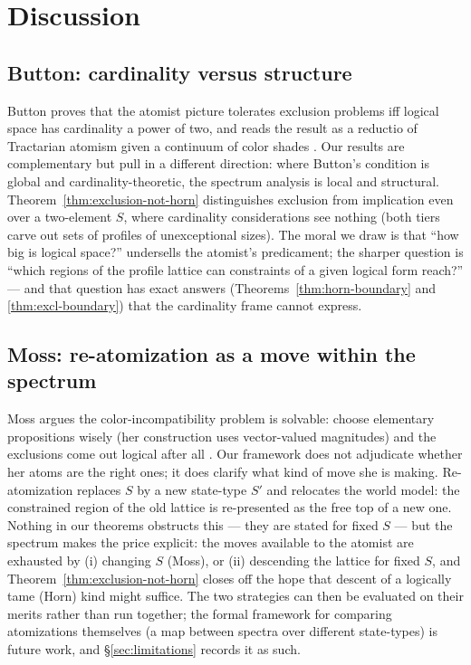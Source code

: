 \documentclass[10pt, letterpaper]{article}
\theoremstyle{remark}
\begin{document}
\section{Discussion}\label{sec:discussion}

\subsection{Button: cardinality versus structure}

Button proves that the atomist picture tolerates exclusion problems iff
logical space has cardinality a power of two, and reads the result as a
reductio of Tractarian atomism given a continuum of color shades
\cite{button2017}. Our results are complementary but pull in a different
direction: where Button's condition is global and cardinality-theoretic, the
spectrum analysis is local and structural. Theorem~\ref{thm:exclusion-not-horn}
distinguishes exclusion from implication even over a two-element $S$, where
cardinality considerations see nothing (both tiers carve out sets of profiles
of unexceptional sizes). The moral we draw is that ``how big is logical
space?'' undersells the atomist's predicament; the sharper question is
``which regions of the profile lattice can constraints of a given logical
form reach?'' --- and that question has exact answers
(Theorems~\ref{thm:horn-boundary} and \ref{thm:excl-boundary}) that the
cardinality frame cannot express.

\subsection{Moss: re-atomization as a move within the spectrum}

Moss argues the color-incompatibility problem is solvable: choose elementary
propositions wisely (her construction uses vector-valued magnitudes) and the
exclusions come out logical after all \cite{moss2012}. Our framework does not
adjudicate whether her atoms are the right ones; it does clarify what kind of
move she is making. Re-atomization replaces $S$ by a new state-type $S'$ and
relocates the world model: the constrained region of the old lattice is
re-presented as the free top of a new one. Nothing in our theorems obstructs
this --- they are stated for fixed $S$ --- but the spectrum makes the price
explicit: the moves available to the atomist are exhausted by (i) changing
$S$ (Moss), or (ii) descending the lattice for fixed $S$, and
Theorem~\ref{thm:exclusion-not-horn} closes off the hope that descent of a
logically tame (Horn) kind might suffice. The two strategies can then be
evaluated on their merits rather than run together; the formal framework for
comparing atomizations themselves (a map between spectra over different
state-types) is future work, and \S\ref{sec:limitations} records it as such.
\end{document}
